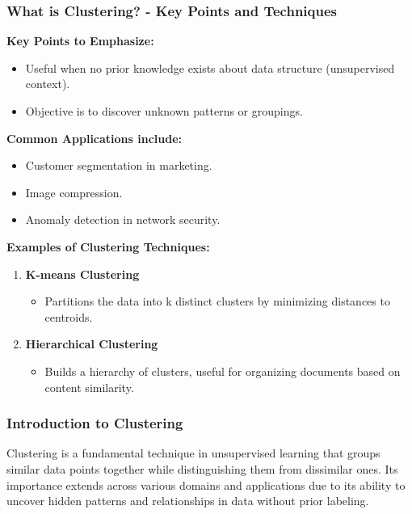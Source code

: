 \documentclass[aspectratio=169]{beamer}
\begin{document}
\begin{frame}[fragile]
    \frametitle{What is Clustering? - Key Points and Techniques}
    \textbf{Key Points to Emphasize:}
    \begin{itemize}
        \item Useful when no prior knowledge exists about data structure (unsupervised context).
        \item Objective is to discover unknown patterns or groupings.
    \end{itemize}

    \textbf{Common Applications include:}
    \begin{itemize}
        \item Customer segmentation in marketing.
        \item Image compression.
        \item Anomaly detection in network security.
    \end{itemize}

    \textbf{Examples of Clustering Techniques:}
    \begin{enumerate}
        \item \textbf{K-means Clustering}
        \begin{itemize}
            \item Partitions the data into k distinct clusters by minimizing distances to centroids.
        \end{itemize}
        \item \textbf{Hierarchical Clustering}
        \begin{itemize}
            \item Builds a hierarchy of clusters, useful for organizing documents based on content similarity.
        \end{itemize}
    \end{enumerate}
\end{frame}

\begin{frame}[fragile]
    \frametitle{Introduction to Clustering}
    Clustering is a fundamental technique in unsupervised learning that groups similar data points together while distinguishing them from dissimilar ones. 
    Its importance extends across various domains and applications due to its ability to uncover hidden patterns and relationships in data without prior labeling.
\end{frame}
\end{document}
